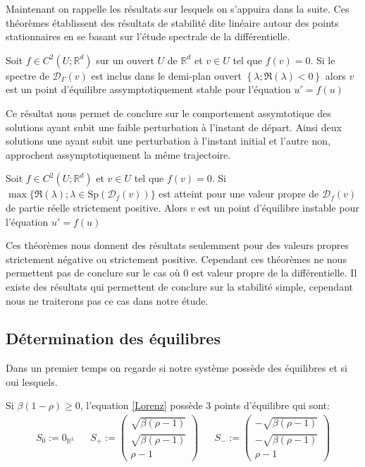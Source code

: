 \documentclass{article}
\newcommand*\colv[1]{
\left(\begin{array}{c}
    #1
\end{array}\right)
}
\newcommand{\R}{\mathbb{R}}
\newtheorem[M , nocut]{prop}{Proposition}[section]
\newtheorem[M , nocut]{definition}{Définition}
\newtheorem[M , nocut]{lemme}{Lemme}
\newtheorem[L , nocut]{thm}{Théoreme}
\newtheorem[M , nocut]{cor}{Corollaire}
\begin{document}
Maintenant on rappelle les résultats sur lesquels on s'appuira dans la suite. Ces théorèmes établissent des résultats de stabilité dite linéaire autour des points stationnaires en se basant sur l'étude spectrale de la différentielle.
\begin{thm}
    \label{thm:eq-ass-stable}
    Soit $f\in C^2(U;\R^d)$ sur un ouvert $U$ de $\R^d$ et $v\in U$ tel que $f(v)=0$. Si le spectre de $\mathcal{D}_\Gamma(v)$ est inclus dans le demi-plan ouvert $\left\{\lambda; \Re(\lambda)<0\right\}$ alors $v$ est un point d'équilibre assymptotiquement stable pour l'équation $u'=f(u)$
\end{thm}

Ce résultat nous permet de conclure sur le comportement assymtotique des solutions ayant subit une faible perturbation à l'instant de départ. Ainsi deux solutions une ayant subit une perturbation à l'instant initial et l'autre non, approchent assymptotiquement la même trajectoire.

\begin{thm}
    \label{thm:eq-instable}
    Soit $f\in C^2(U;\R^d)$ et $v\in U$ tel que $f(v)=0$. Si $\max\{\Re(\lambda); \lambda\in \mathrm{Sp}(\mathcal{D}_f(v))\}$ est atteint pour une valeur propre de $\mathcal{D}_f(v)$ de partie réelle strictement positive. Alors $v$ est un point d'équilibre instable pour l'équation $u'=f(u)$
\end{thm}


Ces théorèmes nous donnent des résultats seulemment pour des valeurs propres strictement négative ou strictement positive. Cependant ces théorèmes ne nous permettent pas de conclure sur le cas où $0$ est valeur propre de la différentielle. Il existe des résultats qui permettent de conclure sur la stabilité simple, cependant nous ne traiterons pas ce cas dans notre étude.

\subsection{Détermination des équilibres}
Dans un premier temps on regarde si notre système possède des équilibres et si oui lesquels.
\begin{prop}
    Si $\beta(1-\rho) \ge 0$, l'equation \eqref{Lorenz} possède 3 points d'équilibre qui sont:
    \begin{align*}
        S_0 := 0_{\R^3} &&   S_+ :=\colv{\sqrt{ \beta (\rho -1)} \\ \sqrt{\beta (\rho -1)}\\ \rho -1}  &&  S_- := \colv{-\sqrt{ \beta (\rho -1)} \\ - \sqrt{\beta (\rho -1)}\\ \rho -1}
    \end{align*}
\end{prop}
\end{document}
